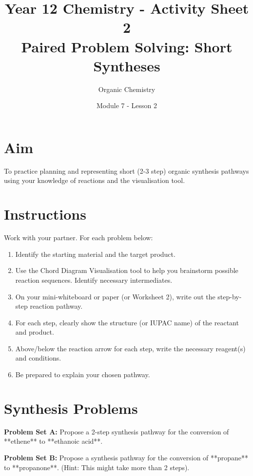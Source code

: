 \documentclass[11pt, a4paper]{article}
\title{Year 12 Chemistry - Activity Sheet 2 \\ Paired Problem Solving: Short Syntheses}
\date{Module 7 - Lesson 2}
\author{Organic Chemistry}
\begin{document}
\maketitle

\section*{Aim}
To practice planning and representing short (2-3 step) organic synthesis pathways using your knowledge of reactions and the visualisation tool.

\section*{Instructions}
Work with your partner. For each problem below:
\begin{enumerate}
    \item Identify the starting material and the target product.
    \item Use the Chord Diagram Visualisation tool to help you brainstorm possible reaction sequences. Identify necessary intermediates.
    \item On your mini-whiteboard or paper (or Worksheet 2), write out the step-by-step reaction pathway.
    \item For each step, clearly show the structure (or IUPAC name) of the reactant and product.
    \item Above/below the reaction arrow for each step, write the necessary reagent(s) and conditions.
    \item Be prepared to explain your chosen pathway.
\end{enumerate}

\section*{Synthesis Problems}

\textbf{Problem Set A:}
Propose a 2-step synthesis pathway for the conversion of **ethene** to **ethanoic acid**.

\vspace{1cm} \hrulefill \vspace{1cm}

\textbf{Problem Set B:}
Propose a synthesis pathway for the conversion of **propane** to **propanone**. (Hint: This might take more than 2 steps).

\vspace{1cm} \hrulefill \vspace{1cm}
\end{document}
